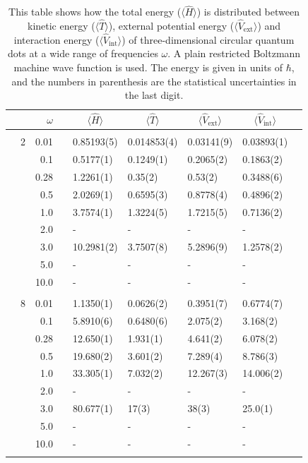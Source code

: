 \begin{table}
	\caption{This table shows how the total energy ($\langle\hat{H}\rangle$) is distributed between kinetic energy ($\langle\hat{T}\rangle$), external potential energy ($\langle\hat{V}_{\text{ext}}\rangle$) and interaction energy ($\langle\hat{V}_{\text{int}}\rangle$) of three-dimensional circular quantum dots at a wide range of frequencies $\omega$. A plain restricted Boltzmann machine wave function is used. The energy is given in units of $\hbar$, and the numbers in parenthesis are the statistical uncertainties in the last digit.}
	\label{tab:splitfrequencyQDRBM3D}
	\begin{tabularx}{\textwidth}{R{1cm}rrcR{2.3cm}R{2.3cm}R{2.3cm}R{2.3cm}R{1cm}} \hline\hline
		&\makecell{\\ \phantom{$N$} \\ \phantom{=}} & $\omega$ &&  &  &  &  & \\ \hline \\
		&2 & 0.01 && 0.85193(5) & 0.014853(4) & 0.03141(9) & 0.03893(1) \\
		&& 0.1 && 0.5177(1) & 0.1249(1) & 0.2065(2) & 0.1863(2) \\
		&& 0.28 && 1.2261(1) & 0.35(2) & 0.53(2) & 0.3488(6) \\
		&& 0.5 && 2.0269(1) & 0.6595(3) & 0.8778(4) & 0.4896(2) \\
		&& 1.0 && 3.7574(1) & 1.3224(5) & 1.7215(5) & 0.7136(2) \\
		&& 2.0 && - & - & - & -\\
		&& 3.0 && 10.2981(2) & 3.7507(8) & 5.2896(9) & 1.2578(2) \\ 
		&& 5.0 && - & - & - & -\\
		&& 10.0 && - & - & - & -\\
		\hdashline \\
		
		&8 & 0.01 && 1.1350(1) & 0.0626(2) & 0.3951(7) & 0.6774(7) \\
		&& 0.1 && 5.8910(6) & 0.6480(6) & 2.075(2) & 3.168(2) \\
		&& 0.28 && 12.650(1) & 1.931(1) & 4.641(2) & 6.078(2) \\
		&& 0.5 && 19.680(2) & 3.601(2) & 7.289(4) & 8.786(3) \\
		&& 1.0 && 33.305(1) & 7.032(2) & 12.267(3) & 14.006(2) \\
		&& 2.0 && - & - & - & -\\
		&& 3.0 && 80.677(1) & 17(3) & 38(3) & 25.0(1) \\ 
		&& 5.0 && - & - & - & -\\
		&& 10.0 && - & - & - & -\\
		\hdashline \\
		

\end{tabularx}
\end{table}
